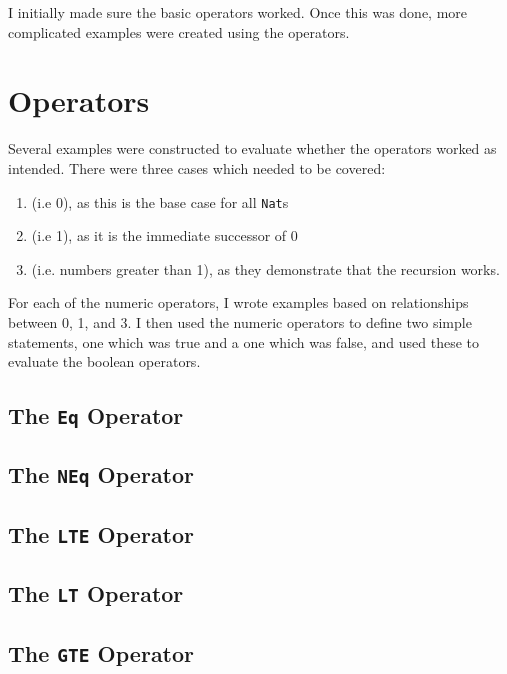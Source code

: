 I initially made sure the basic operators worked. Once this was done, more
complicated examples were created using the operators.
\section{Operators}
	Several examples were constructed to evaluate whether the operators worked
	as intended. There were three cases which needed to be covered:
	\begin{enumerate}
		\item {} (i.e 0), as this is the base case for all
			  \texttt{Nat}s
		\item {} (i.e 1), as it is the immediate successor of 0
		\item {} (i.e. numbers greater than 1), as they
			  demonstrate that the recursion works.
	\end{enumerate}
	For each of the numeric operators, I wrote examples based on relationships between 0, 1, and 3. I then used the numeric operators to define two simple statements, one which was true and a one which was false, and used these to evaluate the boolean operators.
	
	\newpage
	
    \subsection{The \texttt{Eq} Operator}
    
    \subsection{The \texttt{NEq} Operator}
    
    \subsection{The \texttt{LTE} Operator}
    
    \subsection{The \texttt{LT} Operator}
    
    \subsection{The \texttt{GTE} Operator}
    

